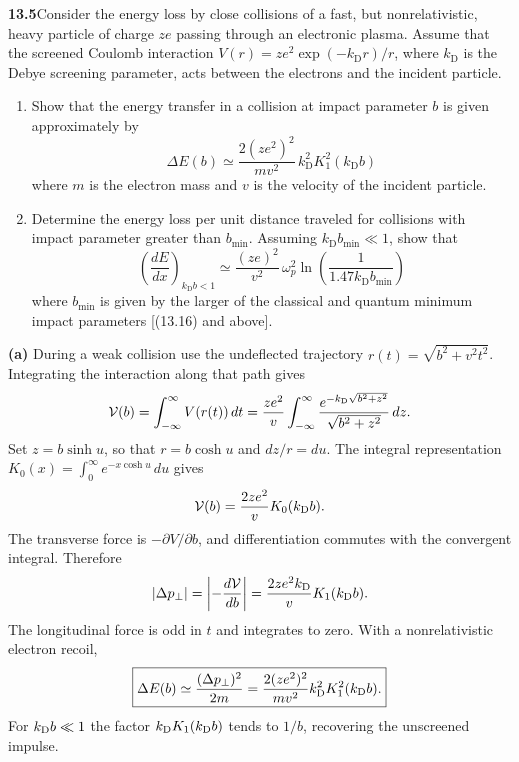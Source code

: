 \par\bigskip
\noindent\textbf{13.5}\quad Consider the energy loss by close collisions of a fast, but nonrelativistic, heavy particle of charge $ze$ passing through an electronic plasma. Assume that the screened Coulomb interaction $V(r)=ze^{2}\exp(-k_{\mathrm{D}}r)/r$, where $k_{\mathrm{D}}$ is the Debye screening parameter, acts between the electrons and the incident particle.
\begin{enumerate}
\item[(a)] Show that the energy transfer in a collision at impact parameter $b$ is given approximately by
\[
\Delta E(b)\simeq\frac{2(ze^{2})^{2}}{mv^{2}}\,k_{\mathrm{D}}^{2}K_{1}^{2}(k_{\mathrm{D}}b)
\]
where $m$ is the electron mass and $v$ is the velocity of the incident particle.
\item[(b)] Determine the energy loss per unit distance traveled for collisions with impact parameter greater than $b_{\min}$. Assuming $k_{\mathrm{D}}b_{\min}\ll1$, show that
\[
\left(\frac{dE}{dx}\right)_{k_{\mathrm{D}}b<1}\simeq\frac{(ze)^{2}}{v^{2}}\,\omega_{p}^{2}\ln\!\left(\frac{1}{1.47k_{\mathrm{D}}b_{\min}}\right)
\]
where $b_{\min}$ is given by the larger of the classical and quantum minimum impact parameters [(13.16) and above].
\end{enumerate}
\solution
\textbf{(a)} During a weak collision use the undeflected trajectory
$r(t)=\sqrt{b^2+v^2t^2}$. Integrating the interaction along that path gives
\[
 {\cal V}(b)=\int_{-\infty}^{\infty}V(r(t))\,dt
 =\frac{ze^2}{v}\int_{-\infty}^{\infty}
 \frac{e^{-k_{\rm D}\sqrt{b^2+z^2}}}{\sqrt{b^2+z^2}}\,dz.
\]
Set $z=b\sinh u$, so that $r=b\cosh u$ and $dz/r=du$. The
integral representation $K_0(x)=\int_0^\infty e^{-x\cosh u}\,du$ gives
\[
 {\cal V}(b)=\frac{2ze^2}{v}K_0(k_{\rm D}b).
\]
The transverse force is $-\partial V/\partial b$, and differentiation
commutes with the convergent integral. Therefore
\[
 |\Delta p_\perp|=\left|-\frac{d{\cal V}}{db}\right|
 =\frac{2ze^2k_{\rm D}}vK_1(k_{\rm D}b).
\]
The longitudinal force is odd in $t$ and integrates to zero. With a
nonrelativistic electron recoil,
\[
 \boxed{\Delta E(b)\simeq\frac{(\Delta p_\perp)^2}{2m}
  =\frac{2(ze^2)^2}{mv^2}k_{\rm D}^2K_1^2(k_{\rm D}b).}
\]
For $k_{\rm D}b\ll1$ the factor $k_{\rm D}K_1(k_{\rm D}b)$ tends
to $1/b$, recovering the unscreened impulse.

